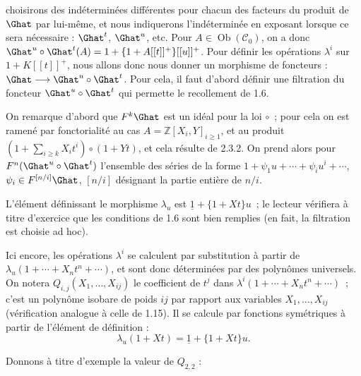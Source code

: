 choisirons des indéterminées différentes pour chacun des facteurs du produit de \(\Ghat\) par lui-même, et nous indiquerons l'indéterminée en exposant lorsque ce sera nécessaire : \(\Ghat^t\), \(\Ghat^u\), etc. Pour \(A\in\operatorname{Ob}(\mathcal C_0)\), on a donc \(\Ghat^u\circ\Ghat^t(A)=1+\{1+A[[t]]^+\}[[u]]^+\). Pour définir les opérations \(\lambda^i\) sur \(1+K[[t]]^+\), nous allons donc nous donner un morphisme de foncteurs : \(\Ghat\longrightarrow\Ghat^u\circ\Ghat^t\).
Pour cela, il faut d'abord définir une filtration du foncteur \(\Ghat^u\circ\Ghat^t\) qui permette le recollement de 1.6.

On remarque d'abord que \(F^k\Ghat\) est un idéal pour la loi \(\circ\)~; pour cela on est ramené par fonctorialité au cas \(A=\mathbb Z[X_i,Y]_{i\geq1}\), et au produit \(\left(1+\sum_{i\geq k}X_i t^i\right)\circ(1+Yt)\), et cela résulte de 2.3.2. On prend alors pour \(F^n(\Ghat^u\circ\Ghat^t)\) l'ensemble des séries de la forme \(1+\psi_1u+\cdots+\psi_i u^i+\cdots\), \(\psi_i\in F^{[n/i]}\Ghat\), \([n/i]\) désignant la partie entière de \(n/i\).

L'élément définissant le morphisme \(\lambda_u\) est \(\underline{1}+\{1+Xt\}u\)~; le lecteur vérifiera à titre d'exercice que les conditions de 1.6 sont bien remplies (en fait, la filtration est choisie ad hoc).

Ici encore, les opérations \(\lambda^i\) se calculent par substitution à partir de \(\lambda_u(1+\cdots+X_nt^n+\cdots)\), et sont donc déterminées par des polynômes universels. On notera \(Q_{i,j}(X_1,\ldots,X_{ij})\) le coefficient de \(t^j\) dans \(\lambda^i(1+\cdots+X_nt^n+\cdots)\)~; c'est un polynôme isobare de poids \(ij\) par rapport aux variables \(X_1,\ldots,X_{ij}\) (vérification analogue à celle de 1.15). Il se calcule par fonctions symétriques à partir de l'élément de définition :
\begin{equation}\tag{2.3.3}
  \lambda_u(1+Xt)=\underline{1}+\{1+Xt\}u.
\end{equation}

Donnons à titre d'exemple la valeur de \(Q_{2,2}\) :

